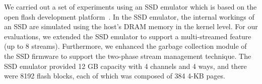 We carried out a set of experiments using an SSD emulator which is based on the
open flash development platform~\cite{AMF}.  
In the SSD emulator, the internal workings of an SSD are simulated using the host's DRAM memory in the kernel level. 
For our evaluations, we extended the SSD emulator to support a multi-streamed feature %
(up to 8 streams). %
Furthermore, we enhanced the garbage collection module of the SSD firmware to support the two-phase stream management technique. 
The SSD emulator provided 12 GB capacity with 4 channels and 4 ways, and there were 8192 flash blocks, each of which was composed of 384 4-KB pages.  


